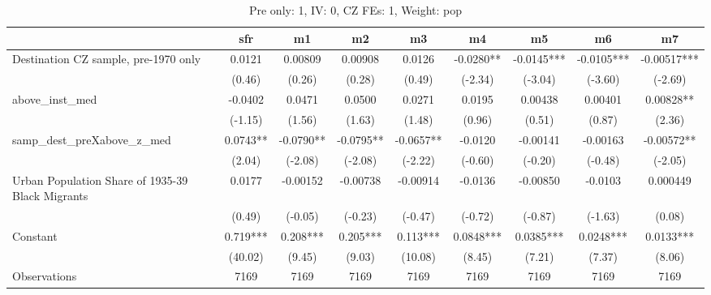 \begin{table}[htbp]\centering
\def\sym#1{\ifmmode^{#1}\else\(^{#1}\)\fi}
\caption{Pre only: 1, IV: 0, CZ FEs: 1, Weight: pop}
\begin{tabular}{l*{8}{c}}
\toprule
                    &\multicolumn{1}{c}{sfr}&\multicolumn{1}{c}{m1}&\multicolumn{1}{c}{m2}&\multicolumn{1}{c}{m3}&\multicolumn{1}{c}{m4}&\multicolumn{1}{c}{m5}&\multicolumn{1}{c}{m6}&\multicolumn{1}{c}{m7}\\
\midrule
Destination CZ sample, pre-1970 only&      0.0121   &     0.00809   &     0.00908   &      0.0126   &     -0.0280** &     -0.0145***&     -0.0105***&    -0.00517***\\
                    &      (0.46)   &      (0.26)   &      (0.28)   &      (0.49)   &     (-2.34)   &     (-3.04)   &     (-3.60)   &     (-2.69)   \\
\addlinespace
above\_inst\_med      &     -0.0402   &      0.0471   &      0.0500   &      0.0271   &      0.0195   &     0.00438   &     0.00401   &     0.00828** \\
                    &     (-1.15)   &      (1.56)   &      (1.63)   &      (1.48)   &      (0.96)   &      (0.51)   &      (0.87)   &      (2.36)   \\
\addlinespace
samp\_dest\_preXabove\_z\_med&      0.0743** &     -0.0790** &     -0.0795** &     -0.0657** &     -0.0120   &    -0.00141   &    -0.00163   &    -0.00572** \\
                    &      (2.04)   &     (-2.08)   &     (-2.08)   &     (-2.22)   &     (-0.60)   &     (-0.20)   &     (-0.48)   &     (-2.05)   \\
\addlinespace
Urban Population Share of 1935-39 Black Migrants&      0.0177   &    -0.00152   &    -0.00738   &    -0.00914   &     -0.0136   &    -0.00850   &     -0.0103   &    0.000449   \\
                    &      (0.49)   &     (-0.05)   &     (-0.23)   &     (-0.47)   &     (-0.72)   &     (-0.87)   &     (-1.63)   &      (0.08)   \\
\addlinespace
Constant            &       0.719***&       0.208***&       0.205***&       0.113***&      0.0848***&      0.0385***&      0.0248***&      0.0133***\\
                    &     (40.02)   &      (9.45)   &      (9.03)   &     (10.08)   &      (8.45)   &      (7.21)   &      (7.37)   &      (8.06)   \\
\midrule
Observations        &        7169   &        7169   &        7169   &        7169   &        7169   &        7169   &        7169   &        7169   \\

\end{tabular}
\end{table}
